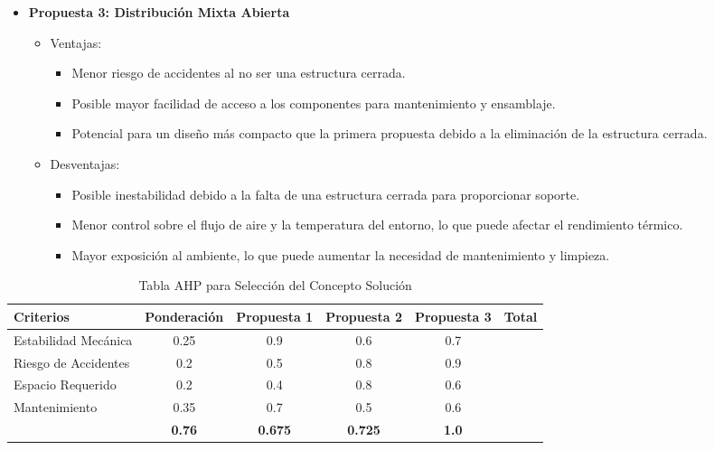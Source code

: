 \documentclass[14pt,oneside]{extarticle} %
\begin{document}
\begin{itemize}
    \newpage
    \item \textbf{Propuesta 3: Distribución Mixta Abierta}
    \begin{itemize}
        \item Ventajas:
        \begin{itemize}
            \item Menor riesgo de accidentes al no ser una estructura cerrada.
            \item Posible mayor facilidad de acceso a los componentes para mantenimiento y ensamblaje.
            \item Potencial para un diseño más compacto que la primera propuesta debido a la eliminación de la estructura cerrada.
        \end{itemize}
        \item Desventajas:
        \begin{itemize}
            \item Posible inestabilidad debido a la falta de una estructura cerrada para proporcionar soporte.
            \item Menor control sobre el flujo de aire y la temperatura del entorno, lo que puede afectar el rendimiento térmico.
            \item Mayor exposición al ambiente, lo que puede aumentar la necesidad de mantenimiento y limpieza.
        \end{itemize}
    \end{itemize}
\end{itemize}


\begin{table}[h]
    \centering
    \begin{tabular}{lccccc}
        \toprule
        \rowcolor{gray!30}
        \textbf{Criterios} & \textbf{Ponderación} & \textbf{Propuesta 1} & \textbf{Propuesta 2} & \textbf{Propuesta 3} & \textbf{Total} \\ \midrule
        Estabilidad Mecánica & 0.25 & 0.9 & 0.6 & 0.7 &  \\
        Riesgo de Accidentes & 0.2 & 0.5 & 0.8 & 0.9 &  \\
        Espacio Requerido & 0.2 & 0.4 & 0.8 & 0.6 &  \\
        Mantenimiento & 0.35 & 0.7 & 0.5 & 0.6 &  \\ \midrule
        \rowcolor{gray!15}
        \multicolumn{2}{c}{\textbf{Total}} & \textbf{0.76} & \textbf{0.675} & \textbf{0.725} & \textbf{1.0} \\ \bottomrule
    \end{tabular}
    \caption{Tabla AHP para Selección del Concepto Solución}
    \label{tab:ahp}
\end{table}
\end{document}
